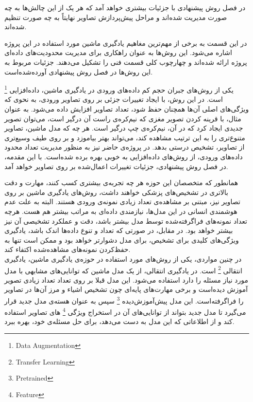 در فصل روش پیشنهادی با جزئیات بیشتری خواهد آمد که هر یک از این چالش‌ها به چه صورت مدیریت شده‌اند و مراحل پیش‌پردازش تصاویر نهایتاً به چه صورت تنظیم شده‌اند.


در این قسمت به برخی از مهم‌ترین مغاهیم یادگیری ماشین مورد استفاده در این پروژه اشاره می‌شود.
این روش‌ها به عنوان راهکاری برای مدیریت محدودیت‌های داده‌ای پروژه ارائه شده‌اند و چهارچوب کلی قسمت فنی را تشکیل می‌دهند.
جزئیات مربوط به این روش‌ها در فصل روش پیشنهادی آورده‌شده‌است.


یکی از روش‌های جبران حجم کم داده‌های ورودی در یادگیری ماشین، داده‌افزایی
\footnote{Data Augmentation}
 است.
در این روش، با ایجاد تغییرات جزئی بر روی تصاویر ورودی، به نحوی که ویژگی‌های اصلی آن‌ها همچنان حفظ شود، تعداد تصاویر افزایش داده می‌شود.
به عنوان مثال، با قرینه کردن تصویر مغزی که نیم‌کره‌ی راست آن درگیر است، می‌‌توان تصویر جدیدی ایجاد کرد که در آن، نیم‌کره‌ی چپ درگیر است.
هر چه که مدل ماشین، تصاویر متنوع‌تری را به این ترتیب مشاهده کند، می‌تواند بهتر بیاموزد و بر روی طیف وسیع‌تری از تصاویر، تشخیص درستی بدهد.
در پروژه‌ی حاضر نیز به منظور مدیریت تعداد محدود داده‌های ورودی، از روش‌های داده‌افزایی به خوبی بهره برده شده‌است.
با این مقدمه، در فصل روش پیشنهادی، جزئیات تغییرات اعمال‌شده بر روی تصاویر خواهد آمد.


همانطور که متخصصان این حوزه هر چه تجربه‌ی بیشتری کسب کنند، مهارت و دقت بالاتری در تشخیص‌های پزشکی خواهند داشت،
روش‌های یادگیری ماشین بر روی تصاویر نیز، مبتنی بر مشاهده‌ی تعداد زیادی نمونه‌ی ورودی هستند.
البته به علت عدم هوشمندی انسانی در این مدل‌ها، نیازمندی داده‌ای به مراتب بیشتر هم هست.
هرچه تعداد نمونه‌های فراگرفته‌شده توسط مدل بیشتر باشد، دقت و عملکرد تشخیصی آن نیز بیشتر خواهد بود.
در مقابل، در صورتی که تعداد و تنوع داده‌ها اندک باشد، یادگیری ویژگی‌های کلیدی برای تشخیص، برای مدل دشوارتر خواهد بود و ممکن است تنها به حفظ‌کردن نمونه‌های مشاهده‌شده اکتفاء کند.\\

در چنین مواردی، یکی از روش‌های مورد استفاده در حوزه‌ی یادگیری ماشین، یادگیری انتقالی
\footnote{Transfer Learning}
 است.
در یادگیری انتقالی، از یک مدل ماشین که توانایی‌های مشابهی با مدل مورد نیاز مسئله را دارد
استفاده می‌شود.
این مدل قبلا بر روی تعداد تعداد زیادی تصویر آموزش دیده‌است و برخی مهارت‌های پایه‌ای چون تشخیص اشیاء و مرز آن‌ها در تصاویر را فراگرفته‌است.
این مدل پیش‌آموزش‌دیده
\footnote{Pretrained}
سپس
به عنوان هسته‌ی مدل جدید قرار می‌گیرد تا مدل جدید بتواند از توانایی‌های آن در استخراج ویژگی
\footnote{Feature}
های تصاویر استفاده کند 
و از اطلاعاتی که این مدل به دست می‌دهد، برای حل مسئله‌ی خود، بهره ببرد.\\

